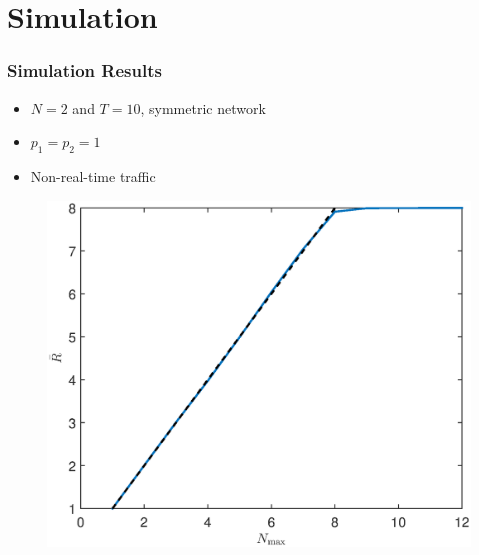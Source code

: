 \documentclass{beamer}
\begin{document}
\section{Simulation}

\begin{frame}
\frametitle{Simulation Results}
\begin{itemize}
\item $N=2$ and $T=10$, symmetric network
\item $p_1 = p_2 = 1$
\item Non-real-time traffic
\end{itemize}
\begin{figure}
\centering
\includegraphics[scale=0.35]{nonrealtime_throughput_randmax.eps}
\end{figure}
\end{frame}
\end{document}
